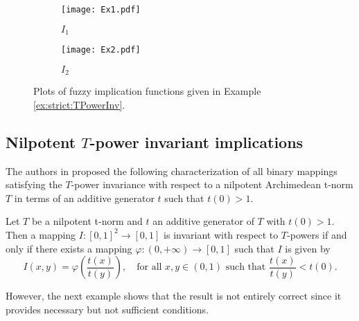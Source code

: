 \begin{example}
\begin{enumerate}[label=(\roman*)]
\begin{figure}
			\centering
			\begin{subfigure}{.5\textwidth}
				\centering
				\texttt{[image: Ex1.pdf]}
				\caption{$I_1$}
				\label{exfig:strict:TPowerInv:subfig1}
			\end{subfigure}%
			\begin{subfigure}{.5\textwidth}
				\centering
				\texttt{[image: Ex2.pdf]}
				\caption{$I_2$}
				\label{exfig:strict:TPowerInv:subfig2}
			\end{subfigure}
			\caption[Plot of two examples of strict $T$-power invariant implications.]{Plots of fuzzy implication functions given in Example \ref{ex:strict:TPowerInv}.}
			\label{exfig:strict:TPowerInv}
		\end{figure}
	\end{enumerate}
\end{example}

\subsection{Nilpotent $T$-power invariant implications}\label{subsection:nilpotentTpowerimplications}

The authors in \cite{Massanet2019B} proposed the following characterization of all binary mappings satisfying the $T$-power invariance with respect to a nilpotent Archimedean t-norm $T$ in terms of an additive generator $t$ such that $t(0)>1$.

\begin{proposition}\label{prop:nilpot:mistake}
	Let $T$ be a nilpotent t-norm and $t$ an additive generator of $T$ with $t(0)>1$. Then a mapping $I:[0,1]^2 \to [0,1]$ is invariant with respect to $T$-powers if and only if there exists a mapping $\varphi:(0,+\infty) \to [0,1]$ such that $I$ is given by
	$$I(x,y)=\varphi \left(\frac{t(x)}{t(y)}\right), \quad \text{for all } x,y \in (0,1) \text{ such that } \frac{t(x)}{t(y)}<t(0).$$
\end{proposition}

However, the next example shows that the result is not entirely correct since it provides necessary but not sufficient conditions.

